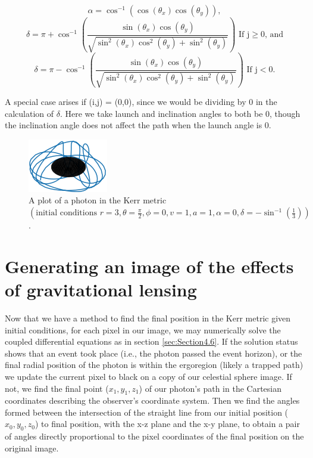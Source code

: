 \documentclass[oneside,openright,frontopenright, singlespacing]{dmathesis}
\begin{document}
	\[\alpha = \cos^{-1}(\cos(\theta_x)\cos(\theta_y)),\]
	\[\delta = \pi+\cos^{-1}\left(\frac{\sin(\theta_x)\cos(\theta_y)}{\sqrt{\sin^2(\theta_x)\cos^2(\theta_y)+\sin^2(\theta_y)}}\right)\mbox{ If j}\geq0\mbox{, and} \]
	\[\delta = \pi-\cos^{-1}\left(\frac{\sin(\theta_x)\cos(\theta_y)}{\sqrt{\sin^2(\theta_x)\cos^2(\theta_y)+\sin^2(\theta_y)}}\right)\mbox{ If j}<0.\]

	A special case arises if (i,j) = (0,0), since we would be dividing by 0 in the calculation of $\delta$. Here we take launch and inclination angles to both be 0, though the inclination angle does not affect the path when the launch angle is 0.

\begin{figure}[!ht]
	\centering
	\includegraphics[width=0.3\linewidth]{img/kerr-path}
	\caption{A plot of a photon in the Kerr metric $\left( \mbox{initial conditions }r=3, \theta=\frac{\pi}{2}, \phi=0, v=1, a=1, \alpha=0, \delta=-\sin^{-1}(\frac{1}{3})\right)$.}
	\label{fig:Figure4.2}
\end{figure}

\section{Generating an image of the effects of gravitational lensing}\label{sec:Section4.7}

	Now that we have a method to find the final position in the Kerr metric given initial conditions, for each pixel in our image, we may numerically solve the coupled differential equations as in section \ref{sec:Section4.6}. If the solution status shows that an event took place  (i.e., the photon passed the event horizon), or the final radial position of the photon is within the ergoregion (likely a trapped path) we update the current pixel to black on a copy of our celestial sphere image. If not, we find the final point ($x_1,y_1,z_1$) of our photon's path in the Cartesian coordinates describing the observer's coordinate system. Then we find the angles formed between the intersection of the straight line from our initial position ($x_0,y_0,z_0$) to final position, with the x-z plane and the x-y plane, to obtain a pair of angles directly proportional to the pixel coordinates of the final position on the original image.
\end{document}
